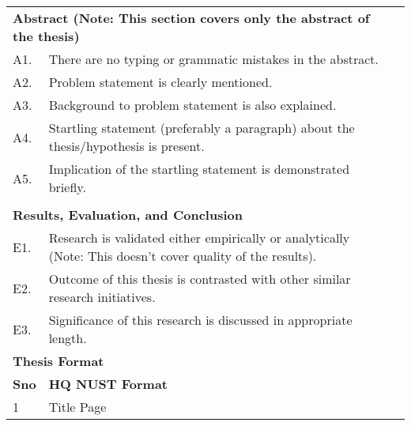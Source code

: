 \begin{table}[!ht]
\footnotesize
\begin{adjustbox}{width=\linewidth,center}
\begin{tabular}{p{0.6cm}p{9cm}p{0.6cm}}
\multicolumn{2}{l}{\textbf{Abstract (Note:   This section covers only the abstract of the thesis)}}                              &  \\
A1.            & There are no typing or grammatic   mistakes in the abstract.                                                    &  \\
A2.            & Problem statement is   clearly mentioned.                                                                       &  \\
A3.            & Background to problem   statement is also explained.                                                            &  \\
A4.            & Startling statement   (preferably a paragraph) about the thesis/hypothesis is present.                          &  \\
A5.            & Implication of the   startling statement is demonstrated briefly.                                               &  \\
               &                                                                                                                 &  \\
\multicolumn{2}{l}{\textbf{Results, Evaluation, and Conclusion}}                                                                 &  \\
E1.            & Research is   validated either empirically or analytically (Note: This doesn’t cover   quality of the results). &  \\
E2.            & Outcome of this   thesis is contrasted with other similar research initiatives.                                 &  \\
E3.            & Significance of this   research is discussed in appropriate length.                                             &  \\
\multicolumn{2}{l}{\textbf{Thesis Format}}                                                                                       &  \\
\textbf{Sno}   & \multicolumn{2}{l}{\textbf{HQ NUST Format}}                                                                        \\
1              & Title Page                                                                                                      &  \\

\end{tabular}
\end{adjustbox}
\end{table}
